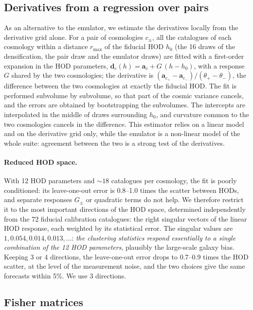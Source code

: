 \documentclass[11pt,twocolumn]{article}
\begin{document}
\subsection{Derivatives from a regression over pairs}
\label{sec:regression}

As an alternative to the emulator, we estimate the derivatives locally from the derivative grid alone. For a pair of cosmologies $c_\pm$, all the catalogues of each cosmology within a distance $r_{\max}$ of the fiducial HOD $h_0$ (the 16 draws of the densification, the pair draw and the emulator draws) are fitted with a first-order expansion in the HOD parameters, $\boldsymbol d_c(h) = \boldsymbol a_c + G\,(h-h_0)$, with a response $G$ shared by the two cosmologies; the derivative is $(\boldsymbol a_{c_+}-\boldsymbol a_{c_-})/(\theta_+-\theta_-)$, the difference between the two cosmologies at exactly the fiducial HOD. The fit is performed subvolume by subvolume, so that part of the cosmic variance cancels, and the errors are obtained by bootstrapping the subvolumes. The intercepts are interpolated in the middle of draws surrounding $h_0$, and curvature common to the two cosmologies cancels in the difference. This estimator relies on a linear model and on the derivative grid only, while the emulator is a non-linear model of the whole suite: agreement between the two is a strong test of the derivatives.

\paragraph{Reduced HOD space.} With 12 HOD parameters and $\sim18$ catalogues per cosmology, the fit is poorly conditioned: its leave-one-out error is 0.8--1.0 times the scatter between HODs, and separate responses $G_\pm$ or quadratic terms do not help. We therefore restrict it to the most important directions of the HOD space, determined independently from the 72 fiducial calibration catalogues: the right singular vectors of the linear HOD response, each weighted by its statistical error. The singular values are $1, 0.054, 0.014, 0.013,\dots$: \emph{the clustering statistics respond essentially to a single combination of the 12 HOD parameters}, plausibly the large-scale galaxy bias. Keeping 3 or 4 directions, the leave-one-out error drops to 0.7--0.9 times the HOD scatter, at the level of the measurement noise, and the two choices give the same forecasts within 5\%. We use 3 directions.

\subsection{Fisher matrices}
\label{sec:fishermat}
\end{document}
